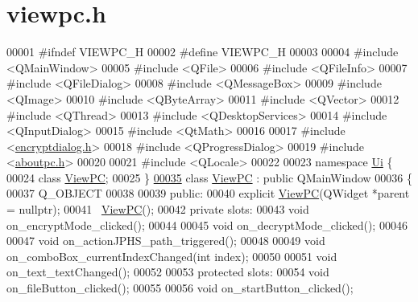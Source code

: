\hypertarget{viewpc_8h_source}{}\section{viewpc.\+h}
\label{viewpc_8h_source}

\begin{DoxyCode}
00001 \textcolor{preprocessor}{#ifndef VIEWPC\_H}
00002 \textcolor{preprocessor}{#define VIEWPC\_H}
00003 
00004 \textcolor{preprocessor}{#include <QMainWindow>}
00005 \textcolor{preprocessor}{#include <QFile>}
00006 \textcolor{preprocessor}{#include <QFileInfo>}
00007 \textcolor{preprocessor}{#include <QFileDialog>}
00008 \textcolor{preprocessor}{#include <QMessageBox>}
00009 \textcolor{preprocessor}{#include <QImage>}
00010 \textcolor{preprocessor}{#include <QByteArray>}
00011 \textcolor{preprocessor}{#include <QVector>}
00012 \textcolor{preprocessor}{#include <QThread>}
00013 \textcolor{preprocessor}{#include <QDesktopServices>}
00014 \textcolor{preprocessor}{#include <QInputDialog>}
00015 \textcolor{preprocessor}{#include <QtMath>}
00016 
00017 \textcolor{preprocessor}{#include <\hyperlink{encryptdialog_8h}{encryptdialog.h}>}
00018 \textcolor{preprocessor}{#include <QProgressDialog>}
00019 \textcolor{preprocessor}{#include <\hyperlink{aboutpc_8h}{aboutpc.h}>}
00020 
00021 \textcolor{preprocessor}{#include <QLocale>}
00022 
00023 \textcolor{keyword}{namespace }\hyperlink{namespace_ui}{Ui} \{
00024 \textcolor{keyword}{class }\hyperlink{class_view_p_c}{ViewPC};
00025 \}
\hypertarget{viewpc_8h_source.tex_l00035}{}\hyperlink{class_view_p_c}{00035} \textcolor{keyword}{class }\hyperlink{class_view_p_c}{ViewPC} : \textcolor{keyword}{public} QMainWindow
00036 \{
00037     Q\_OBJECT
00038 
00039 \textcolor{keyword}{public}:
00040     \textcolor{keyword}{explicit} \hyperlink{class_view_p_c}{ViewPC}(QWidget *parent = \textcolor{keyword}{nullptr});
00041     ~\hyperlink{class_view_p_c}{ViewPC}();
00042 \textcolor{keyword}{private} slots:
00043     \textcolor{keywordtype}{void} on\_encryptMode\_clicked();
00044 
00045     \textcolor{keywordtype}{void} on\_decryptMode\_clicked();
00046 
00047     \textcolor{keywordtype}{void} on\_actionJPHS\_path\_triggered();
00048 
00049     \textcolor{keywordtype}{void} on\_comboBox\_currentIndexChanged(\textcolor{keywordtype}{int} index);
00050 
00051     \textcolor{keywordtype}{void} on\_text\_textChanged();
00052 
00053 \textcolor{keyword}{protected} slots:
00054     \textcolor{keywordtype}{void} on\_fileButton\_clicked();
00055 
00056     \textcolor{keywordtype}{void} on\_startButton\_clicked();

\end{DoxyCode}
